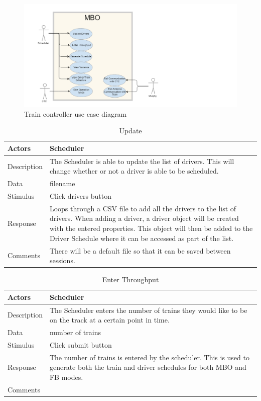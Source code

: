 \documentclass[]{article}
\begin{document}
\begin{figure}[H]
	\centering
	\includegraphics[scale=.5]{mbousecase.png}
	\caption{Train controller use case diagram}
\end{figure}
\begin{table}[H]
	\centering
	\caption{Update}
	\begin{tabular}{|l|l|}
		\hline
		Actors & \parbox[t]{10cm}{Scheduler} \\ \hline
		Description & \parbox[t]{10cm}{The Scheduler is able to update the list of drivers. This will change whether or not a driver is able to be scheduled.} \\ \hline
		Data &  \parbox[t]{10cm}{filename} \\ \hline
		Stimulus &  \parbox[t]{10cm}{Click drivers button} \\ \hline
		Response & \parbox[t]{10cm}{Loops through a CSV file to add all the drivers to the list of drivers. When adding a driver, a driver object will be created with the entered properties. This object will then be added to the Driver Schedule where it can be accessed as part of the list.}\\ \hline
		Comments & \parbox[t]{10cm}{There will be a default file so that it can be saved between sessions.}  \\ \hline
	\end{tabular}
\end{table}

\begin{table}[H]
	\centering
	\caption{Enter Throughput}
	\begin{tabular}{|l|l|}
		\hline
		Actors & \parbox[t]{10cm}{Scheduler} \\ \hline
		Description & \parbox[t]{10cm}{The Scheduler enters the number of trains they would like to be on the track at a certain point in time.} \\ \hline
		Data &  \parbox[t]{10cm}{number of trains} \\ \hline
		Stimulus &  \parbox[t]{10cm}{Click submit button} \\ \hline
		Response & \parbox[t]{10cm}{The number of trains is entered by the scheduler. This is used to generate both the train and driver schedules for both MBO and FB modes.}\\ \hline
		Comments & \parbox[t]{10cm}{}  \\ \hline
	\end{tabular}
\end{table}
\end{document}
